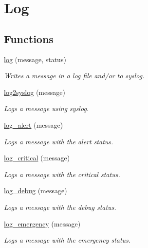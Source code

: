 \hypertarget{group__log}{}\section{Log}
\label{group__log}
\subsection*{Functions}
\begin{DoxyCompactItemize}
\item 
\hyperlink{group__log_ga037d4a587495695fb9072697bd3b2a1c}{log} (message, status)
\begin{DoxyCompactList}\small\item\em Writes a message in a log file and/or to syslog. \end{DoxyCompactList}\item 
\hyperlink{group__log_ga7d0774857ae14ce00dac9e9cb4183ed8}{log2syslog} (message)
\begin{DoxyCompactList}\small\item\em Logs a message using syslog. \end{DoxyCompactList}\item 
\hyperlink{group__log_ga36dd3783b9386bf202d2c81c24470466}{log\+\_\+alert} (message)
\begin{DoxyCompactList}\small\item\em Logs a message with the \textquotesingle{}alert\textquotesingle{} status. \end{DoxyCompactList}\item 
\hyperlink{group__log_ga2f066e08ce5a304ebadeb744a1a48841}{log\+\_\+critical} (message)
\begin{DoxyCompactList}\small\item\em Logs a message with the \textquotesingle{}critical\textquotesingle{} status. \end{DoxyCompactList}\item 
\hyperlink{group__log_ga9333570bec5aeb30b11fa1990c74a72a}{log\+\_\+debug} (message)
\begin{DoxyCompactList}\small\item\em Logs a message with the \textquotesingle{}debug\textquotesingle{} status. \end{DoxyCompactList}\item 
\hyperlink{group__log_ga391012c00347e7080504daf878501a8c}{log\+\_\+emergency} (message)
\begin{DoxyCompactList}\small\item\em Logs a message with the \textquotesingle{}emergency\textquotesingle{} status. \end{DoxyCompactList}\item 

\end{DoxyCompactItemize}
